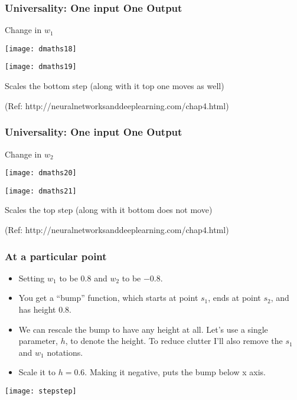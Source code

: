 \begin{frame}[fragile] \frametitle{Universality: One input One Output}
Change in $w_1$

\begin{center}
\texttt{[image: dmaths18]}
\end{center}

\begin{center}
\texttt{[image: dmaths19]}
\end{center}

Scales the bottom step (along with it top one moves as well)

{\tiny (Ref: http://neuralnetworksanddeeplearning.com/chap4.html)}
\end{frame}

\begin{frame}[fragile] \frametitle{Universality: One input One Output}
Change in $w_2$

\begin{center}
\texttt{[image: dmaths20]}
\end{center}

\begin{center}
\texttt{[image: dmaths21]}
\end{center}

Scales the top step (along with it bottom does not move)

{\tiny (Ref: http://neuralnetworksanddeeplearning.com/chap4.html)}
\end{frame}
\begin{frame}[fragile] \frametitle{At a particular point}
\begin{itemize}
\item Setting $ w_1$ to be $0.8$ and $w_2$ to be $-0.8$. 
\item You get a ``bump'' function, which starts at point $s_1$, ends at point $s_2$, and has height $0.8$.
\item We can rescale the bump to have any height at all. Let's use a single parameter, $h$, to denote the height. To reduce clutter I'll also remove the $s_1$ and $w_1$ notations.
\item Scale it to $h = 0.6$. Making it negative, puts the bump below x axis.
\end{itemize}
\begin{center}
\texttt{[image: stepstep]}
\end{center}
\end{frame}

